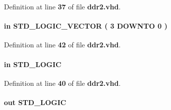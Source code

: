 Definition at line {\bf 37} of file {\bf ddr2.\+vhd}.

\paragraph[{local\+\_\+be}]{ {\bfseries \textcolor{keywordflow}{in}\textcolor{vhdlchar}{ }} {\bfseries \textcolor{comment}{S\+T\+D\+\_\+\+L\+O\+G\+I\+C\+\_\+\+V\+E\+C\+T\+OR}\textcolor{vhdlchar}{ }\textcolor{vhdlchar}{(}\textcolor{vhdlchar}{ }\textcolor{vhdlchar}{ } \textcolor{vhdldigit}{3} \textcolor{vhdlchar}{ }\textcolor{keywordflow}{D\+O\+W\+N\+TO}\textcolor{vhdlchar}{ }\textcolor{vhdlchar}{ } \textcolor{vhdldigit}{0} \textcolor{vhdlchar}{ }\textcolor{vhdlchar}{)}\textcolor{vhdlchar}{ }} \hspace{0.3cm}{\ttfamily [Port]}}\label{classddr2_a417492341d23f1e8ff37483def00622a}


Definition at line {\bf 42} of file {\bf ddr2.\+vhd}.

\paragraph[{local\+\_\+burstbegin}]{ {\bfseries \textcolor{keywordflow}{in}\textcolor{vhdlchar}{ }} {\bfseries \textcolor{comment}{S\+T\+D\+\_\+\+L\+O\+G\+IC}\textcolor{vhdlchar}{ }} \hspace{0.3cm}{\ttfamily [Port]}}\label{classddr2_afa9b5ac3e9678c1a7844374616b7edae}


Definition at line {\bf 40} of file {\bf ddr2.\+vhd}.

\paragraph[{local\+\_\+init\+\_\+done}]{ {\bfseries \textcolor{keywordflow}{out}\textcolor{vhdlchar}{ }} {\bfseries \textcolor{comment}{S\+T\+D\+\_\+\+L\+O\+G\+IC}\textcolor{vhdlchar}{ }} \hspace{0.3cm}{\ttfamily [Port]}}\label{classddr2_a59b57161192a62d9c4c89834f639fabf}


